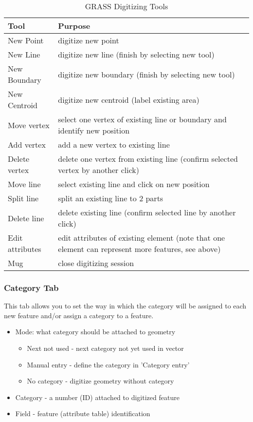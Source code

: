 \begin{table}[h]
\centering
\caption{GRASS Digitizing Tools}\label{tab:grass_tools}\medskip
 \begin{tabular}{|l|p{5in}|}
 \hline \textbf{Tool} & \textbf{Purpose} \\
\hline New Point & digitize new point \\
\hline New Line &  digitize new line (finish by selecting new tool) \\
\hline New Boundary & digitize new boundary (finish by selecting new tool)\\
\hline New Centroid & digitize new centroid (label existing area)\\
\hline Move vertex & select one vertex of existing line or boundary and
identify new position\\
\hline Add vertex & add a new vertex to existing line\\
\hline Delete vertex & delete one vertex from existing line (confirm selected
vertex by another click)\\
\hline Move line & select existing line and click on new position\\
\hline Split line & split an existing line to 2 parts\\
\hline Delete line & delete existing line (confirm selected line by another
click)\\
\hline Edit attributes & edit attributes of existing element (note that one
element can represent more features, see above)\\
\hline Mug & close digitizing session\\
\hline
\end{tabular}
\end{table}

\subsubsection{Category Tab}

This tab allows you to set the way in which the category will be assigned to
each new feature and/or assign a category to a feature.

\begin{itemize}
\item Mode: what category should be attached to geometry
\begin{itemize}
\item Next not used - next category not yet used in vector
\item Manual entry - define the category in 'Category entry'
\item No category - digitize geometry without category
\end{itemize}
\item Category - a number (ID) attached to digitized feature
\item Field - feature (attribute table) identification
\end{itemize}

